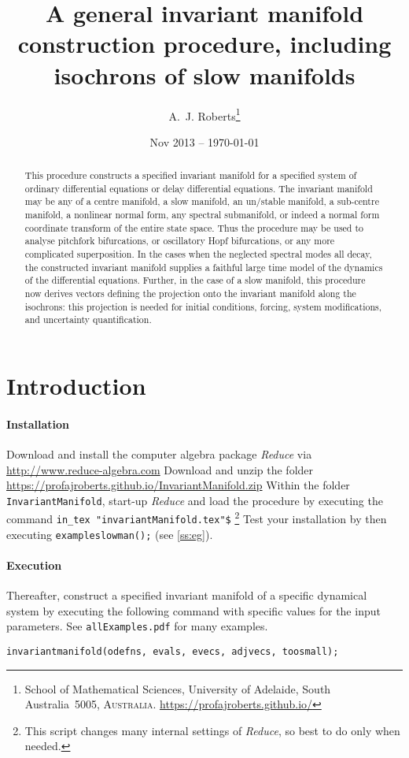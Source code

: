 \documentclass[11pt,a5paper]{article}
\title{A general invariant manifold construction procedure,
including isochrons of slow manifolds}
\author{A.~J. Roberts\thanks{School of Mathematical
Sciences, University of Adelaide, South Australia~5005,
\textsc{Australia}. \url{https://profajroberts.github.io/}}}
\date{Nov 2013 -- \today}
\begin{document}
\sloppy

\maketitle

\begin{abstract}
This procedure constructs a specified invariant manifold for
a specified system of ordinary differential equations or
delay differential equations. The invariant manifold may be
any of a centre manifold, a slow manifold, an un/stable
manifold, a sub-centre manifold, a nonlinear normal form,
any spectral submanifold, or indeed a normal form coordinate
transform of the entire state space. Thus the procedure may
be used to analyse pitchfork bifurcations, or oscillatory
Hopf bifurcations, or any more complicated superposition. In
the cases when the neglected spectral modes all decay, the
constructed invariant manifold supplies a faithful large
time model of the dynamics of the differential equations.
Further, in the case of a slow manifold, this procedure now
derives vectors defining the projection onto the invariant
manifold along the isochrons: this projection is needed for
initial conditions, forcing, system modifications, and
uncertainty quantification.
\end{abstract}

\tableofcontents



\section{Introduction}

\paragraph{Installation}
Download and install the computer algebra package
\emph{Reduce} via \url{http://www.reduce-algebra.com}\quad
Download and unzip the folder
\url{https://profajroberts.github.io/InvariantManifold.zip}
\quad Within the folder \verb|InvariantManifold|, start-up
\emph{Reduce} and load the procedure by executing the
command \verb|in_tex "invariantManifold.tex"$|
\footnote{This script changes many internal settings of
\emph{Reduce}, so best to do only when needed.} Test your
installation by then executing \verb|exampleslowman();|
\quad(see \cref{ss:eg}).

\paragraph{Execution}
Thereafter, construct a specified invariant manifold of a
specific dynamical system by executing the following command
with specific values for the input parameters.  See
\verb|allExamples.pdf| for many examples.
\begin{verbatim}
invariantmanifold(odefns, evals, evecs, adjvecs, toosmall);
\end{verbatim}
\end{document}

